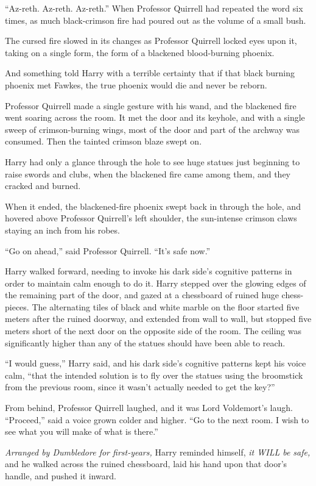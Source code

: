 ``Az-reth. Az-reth. Az-reth.'' When Professor Quirrell had repeated the word six times, as much black-crimson fire had poured out as the volume of a small bush.

The cursed fire slowed in its changes as Professor Quirrell locked eyes upon it, taking on a single form, the form of a blackened blood-burning phoenix.

And something told Harry with a terrible certainty that if that black burning phoenix met Fawkes, the true phoenix would die and never be reborn.

Professor Quirrell made a single gesture with his wand, and the blackened fire went soaring across the room. It met the door and its keyhole, and with a single sweep of crimson-burning wings, most of the door and part of the archway was consumed. Then the tainted crimson blaze swept on.

Harry had only a glance through the hole to see huge statues just beginning to raise swords and clubs, when the blackened fire came among them, and they cracked and burned.

When it ended, the blackened-fire phoenix swept back in through the hole, and hovered above Professor Quirrell's left shoulder, the sun-intense crimson claws staying an inch from his robes.

``Go on ahead,'' said Professor Quirrell. ``It's safe now.''

Harry walked forward, needing to invoke his dark side's cognitive patterns in order to maintain calm enough to do it. Harry stepped over the glowing edges of the remaining part of the door, and gazed at a chessboard of ruined huge chess-pieces. The alternating tiles of black and white marble on the floor started five meters after the ruined doorway, and extended from wall to wall, but stopped five meters short of the next door on the opposite side of the room. The ceiling was significantly higher than any of the statues should have been able to reach.

``I would guess,'' Harry said, and his dark side's cognitive patterns kept his voice calm, ``that the intended solution is to fly over the statues using the broomstick from the previous room, since it wasn't actually needed to get the key?''

From behind, Professor Quirrell laughed, and it was Lord Voldemort's laugh. ``Proceed,'' said a voice grown colder and higher. ``Go to the next room. I wish to see what you will make of what is there.''

\emph{Arranged by Dumbledore for first-years,} Harry reminded himself, \emph{it WILL be safe,} and he walked across the ruined chessboard, laid his hand upon that door's handle, and pushed it inward.


